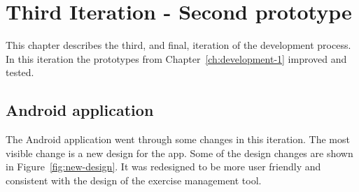 \documentclass[../Main/thesis.tex]{subfiles}
\begin{document}
\chapter{Third Iteration - Second prototype}
\label{ch:development-2}
This chapter describes the third, and final, iteration of the development process.
In this iteration the prototypes from Chapter~\ref{ch:development-1} improved and tested.

\section{Android application}
The Android application went through some changes in this iteration.
The most visible change is a new design for the app.
Some of the design changes are shown in Figure~\ref{fig:new-design}.
It was redesigned to be more user friendly and consistent with the design of the exercise management tool.
\end{document}
